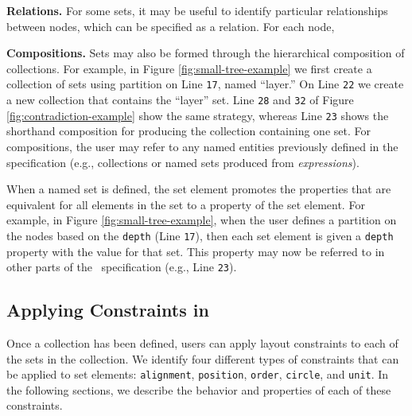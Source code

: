\textbf{Relations.} For some sets, it may be useful to identify particular
relationships between nodes, which can be specified as a relation. For each
node, 

\contradictionExample

\textbf{Compositions.} Sets may also be formed through the hierarchical
composition of collections. For example, in Figure
\ref{fig:small-tree-example} we first create a collection of sets using
partition on Line \texttt{17}, named ``layer.'' On Line \texttt{22} we
create a new collection that contains the ``layer'' set. Line \texttt{28}
and \texttt{32} of Figure \ref{fig:contradiction-example} show the same
strategy, whereas Line \texttt{23} shows the shorthand composition for
producing the collection containing one set. For compositions, the user may
refer to any named entities previously defined in the specification (e.g.,
collections or named sets produced from \emph{expressions}).


When a named set is defined, the set element promotes the properties that
are equivalent for all elements in the set to a property of the set
element. For example, in Figure \ref{fig:small-tree-example}, when the user
defines a partition on the nodes based on the \texttt{depth} (Line
\texttt{17}), then each set element is given a \texttt{depth} property with
the value for that set. This property may now be referred to in other parts
of the \projectname\ specification (e.g., Line \texttt{23}).


\subsection{Applying Constraints in \projectname}
\label{sec:constraints}
Once a collection has been defined, users can apply layout constraints to
each of the sets in the collection. We identify four different types of
constraints that can be applied to set elements: \texttt{alignment},
\texttt{position}, \texttt{order}, \texttt{circle}, and \texttt{unit}. In
the following sections, we describe the behavior and properties of each of
these constraints.


